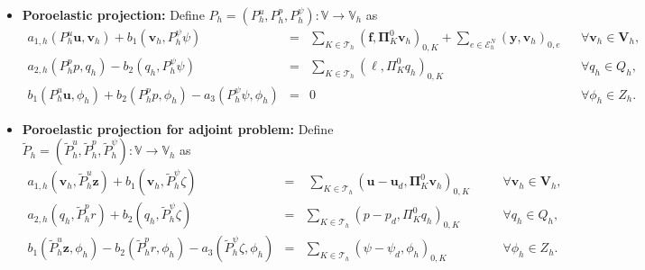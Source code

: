 \documentclass[smallextended]{svjour3}
\numberwithin{equation}{section}
\numberwithin{figure}{section}
\numberwithin{table}{section}
\newcommand\bV{\mathbf{V}}
\newcommand\bPi{\boldsymbol{\Pi}}
\newcommand\ff{\boldsymbol{f}}
\newcommand{\tP}{\tilde{P}}
\newcommand\by{\boldsymbol{y}}
\newcommand\bu{\boldsymbol{u}}
\newcommand\bv{\boldsymbol{v}}
\newcommand\bz{\boldsymbol{z}}
\newcommand\cT{\mathcal{T}}
\newcommand{\bbV}{\mathbb{V}}
\begin{document}
	\begin{itemize}
	\item {\bf Poroelastic projection:} Define $P_h=(P_h^u, P_h^p, P_h^{\psi}): \bbV \to \bbV_h$ as
	\begin{subequations}\label{eq:Poro-proj-N}
		\begin{alignat}{6}
			a_{1,h}(P_h^u \bu, \bv_h)+  b_1(\bv_h, P_h^{\psi} \psi)     &=& \sum_{K \in \cT_h} (\ff, \bPi^{0}_K \bv_h )_{0,K} + \sum_{e \in \mathcal{E}_h^N} (\by, \bv_h )_{0,e}   &&\forall \bv_h \in \bV_h,\\
			a_{2,h}(P_h^p p, q_h)   -    b_2(q_h, P_h^{\psi} \psi)  &=& \sum_{K \in \cT_h} (\ell, \Pi^{0}_K q_h )_{0,K}  \quad &&\forall q_h \in Q_h,  \\
			b_1(P_h^u \bu, \phi_h)  +  b_2(P_h^p p, \phi_h) - a_3(P_h^\psi \psi, \phi_h)  &=&0 \qquad     \qquad &&\forall \phi_h \in Z_h.
	\end{alignat}\end{subequations}

    \item {\bf Poroelastic projection for adjoint problem:} Define $\tP_h=(\tP_h^u, \tP_h^p, \tP_h^{\psi}): \bbV \to \bbV_h$ as
	\begin{subequations}\label{eq:Poro-adjoint-N}
		\begin{alignat}{6}
			a_{1,h}(\bv_h, \tP_h^u \bz) +  b_1(\bv_h, \tP_h^{\psi} \zeta)     &=&\; \sum_{K \in \cT_h} ( \bu - \bu_d, \bPi^{0}_K \bv_h )_{0,K}  &\quad&\forall \bv_h \in \bV_h,\\
			a_{2,h}(q_h, \tP_h^p r)   +    b_2(q_h, \tP_h^{\psi} \zeta)  &=& \sum_{K \in \cT_h} ( p- p_d, \Pi^{0}_K q_h )_{0,K}  &\quad&\forall q_h \in Q_h,  \\
			b_1(\tP_h^u \bz, \phi_h)    -  b_2(\tP_h^p r, \phi_h)- a_3(\tP_h^\psi \zeta, \phi_h)  &=& \sum_{K \in \cT_h} ( \psi- \psi_d, \phi_h )_{0,K} \quad    &\quad&\forall \phi_h \in Z_h.
	\end{alignat}\end{subequations}
    \end{itemize}
    
\end{document}
